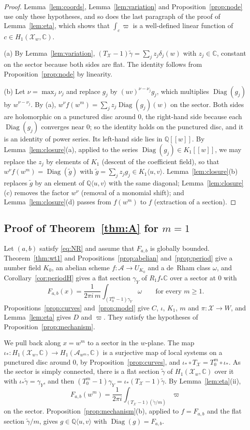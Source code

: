 \documentclass[11pt]{amsart}
\theoremstyle{definition}
\theoremstyle{remark}
\numberwithin{equation}{section}
\newcommand{\Q}{\mathbb{Q}}
\newcommand{\C}{\mathbb{C}}
\newcommand{\cX}{\mathcal{X}}
\newcommand{\cA}{\mathcal{A}}
\newcommand{\alg}[2]{#1\langle #2\rangle}
\DeclareMathOperator{\Diag}{Diag}
\newcommand{\Fab}{F_{a,b}}
\begin{document}
\begin{proof}
Lemma~\ref{lem:coords}, Lemma~\ref{lem:variation} and Proposition~\ref{prop:node} use only these hypotheses, and so does the last paragraph of the proof of Lemma~\ref{lem:eta}, which shows that $\int_c\varpi$ is a well-defined linear function of $c\in H_1(\cX_w,\C)$.

(a) By Lemma~\ref{lem:variation}, $(T_\cX-1)\tilde\gamma=\sum_jz_j\delta_j(w)$ with $z_j\in\C$, constant on the sector because both sides are flat. The identity follows from Proposition~\ref{prop:node} by linearity.

(b) Let $\nu=\max_j\nu_j$ and replace $g_j$ by $(uv)^{\nu-\nu_j}g_j$, which multiplies $\Diag(g_j)$ by $w^{\nu-\nu_j}$. By (a), $w^\nu f(w^m)=\sum_jz_j\Diag(g_j)(w)$ on the sector. Both sides are holomorphic on a punctured disc around $0$, the right-hand side because each $\Diag(g_j)$ converges near $0$; so the identity holds on the punctured disc, and it is an identity of power series. Its left-hand side lies in $\Q[[w]]$. By Lemma~\ref{lem:closure}(a), applied to the series $\Diag(g_j)\in K_1[[w]]$, we may replace the $z_j$ by elements of $K_1$ (descent of the coefficient field), so that $w^\nu f(w^m)=\Diag(\tilde g)$ with $\tilde g=\sum_jz_jg_j\in\alg{K_1}{u,v}$. Lemma~\ref{lem:closure}(b) replaces $\tilde g$ by an element of $\alg\Q{u,v}$ with the same diagonal; Lemma~\ref{lem:closure}(c) removes the factor $w^\nu$ (removal of a monomial shift); and Lemma~\ref{lem:closure}(d) passes from $f(w^m)$ to $f$ (extraction of a section).
\end{proof}

\subsection{Proof of Theorem~\ref{thm:A} for $m=1$}\label{subsec:proofA}
Let $(a,b)$ satisfy \eqref{eq:NR} and assume that $\Fab$ is globally bounded. Theorem~\ref{thm:wt1} and Propositions~\ref{prop:abelian} and~\ref{prop:period} give a number field $K_0$, an abelian scheme $f:\cA\to U_{K_0}$ and a de~Rham class $\omega$, and Corollary~\ref{cor:periodH} gives a flat section $\gamma_Y$ of $R_1f_*\C$ over a sector at $0$ with
\[
\Fab(x)=\frac1{2\pi i\,m}\int_{(T_0^m-1)\gamma_Y}\omega\qquad\text{for every }m\ge1 .
\]
Propositions~\ref{prop:curves} and~\ref{prop:model} give $C$, $\iota$, $K_1$, $m$ and $\pi:\cX\to W$, and Lemma~\ref{lem:eta} gives $D$ and $\varpi$. They satisfy the hypotheses of Proposition~\ref{prop:mechanism}.

We pull back along $x=w^m$ to a sector in the $w$-plane. The map $\iota_*:H_1(\cX_w,\C)\to H_1(\cA_{w^m},\C)$ is a surjective map of local systems on a punctured disc around $0$, by Proposition~\ref{prop:curves}, and $\iota_*\circ T_\cX=T_0^m\circ\iota_*$. As the sector is simply connected, there is a flat section $\tilde\gamma$ of $H_1(\cX_w,\C)$ over it with $\iota_*\tilde\gamma=\gamma_Y$, and then $(T_0^m-1)\gamma_Y=\iota_*(T_\cX-1)\tilde\gamma$. By Lemma~\ref{lem:eta}(ii),
\[
\Fab(w^m)=\frac1{2\pi i}\int_{(T_\cX-1)(\tilde\gamma/m)}\varpi
\]
on the sector. Proposition~\ref{prop:mechanism}(b), applied to $f=\Fab$ and the flat section $\tilde\gamma/m$, gives $g\in\alg\Q{u,v}$ with $\Diag(g)=\Fab$.
\end{document}
